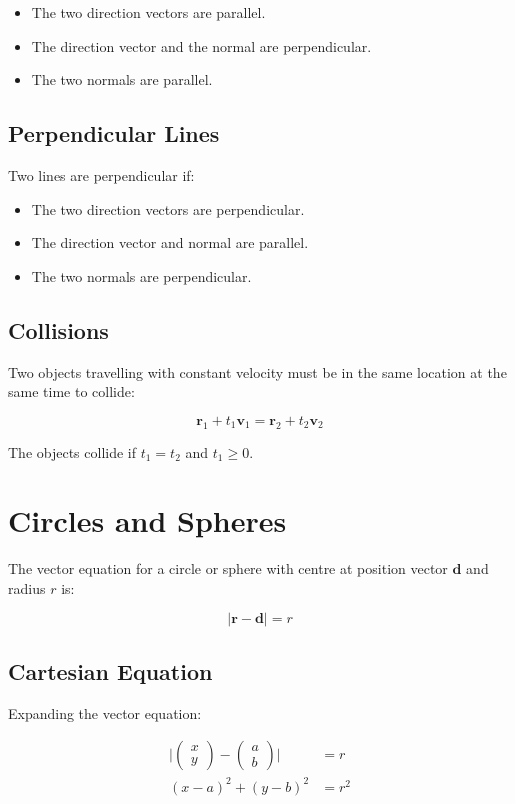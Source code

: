 \documentclass[a4paper,11pt]{article}
\newcommand{\bb}{\boldsymbol}
\begin{document}
\begin{itemize}
\item The two direction vectors are parallel.
\item The direction vector and the normal are perpendicular.
\item The two normals are parallel.
\end{itemize}


\subsection{Perpendicular Lines}

Two lines are perpendicular if:

\begin{itemize}
\item The two direction vectors are perpendicular.
\item The direction vector and normal are parallel.
\item The two normals are perpendicular.
\end{itemize}


\subsection{Collisions}

Two objects travelling with constant velocity must be in the same location at
the same time to collide:

$$
\bb{r}_1 + t_1 \bb{v}_1 = \bb{r}_2 + t_2 \bb{v}_2
$$

The objects collide if $t_1 = t_2$ and $t_1 \geq 0$.




\section{Circles and Spheres}

The vector equation for a circle or sphere with centre at position vector
$\bb{d}$ and radius $r$ is:

$$
\lvert \bb{r} - \bb{d} \rvert = r
$$


\subsection{Cartesian Equation}

Expanding the vector equation:

$$
\begin{aligned}
\lvert \begin{pmatrix} x \\ y \end{pmatrix} - \begin{pmatrix} a \\ b \end{pmatrix} \rvert & = r \\
(x - a)^2 + (y - b)^2 & = r^2 \\
\end{aligned}
$$
\end{document}

